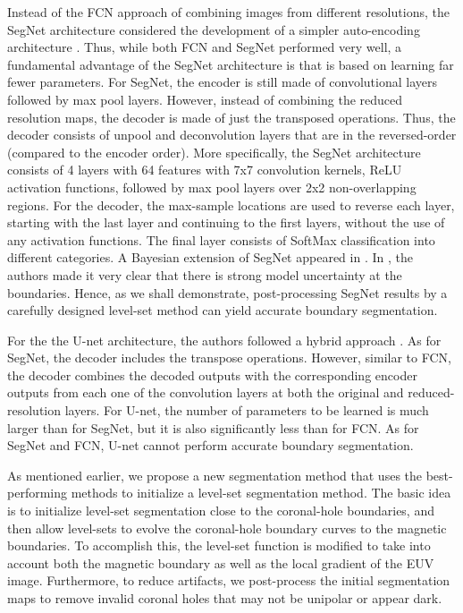 \documentclass[journal]{IEEEtran}
\begin{document}
Instead of the FCN approach of combining 
    images from different resolutions,
    the SegNet architecture considered        
    the development of a simpler
    auto-encoding architecture \cite{SegNet}.
Thus, while both FCN and SegNet performed
    very well, a fundamental advantage of the SegNet
    architecture is that is based on learning
    far fewer parameters.
For SegNet, the encoder is still
    made of convolutional layers followed
    by max pool layers.
However, instead of combining the reduced resolution maps,
    the decoder is made of just the transposed operations.
Thus, the decoder consists of unpool and deconvolution layers
    that are in the reversed-order (compared to the encoder order).
More specifically, the SegNet architecture
    consists of 4 layers with 64 
    features with 7x7 convolution kernels,
    ReLU activation functions,
    followed by max pool layers over 2x2
    non-overlapping regions.
For the decoder, the max-sample locations are used
to reverse each layer, starting with the last layer
and continuing to the first layers, without 
the use of any activation functions.
The final layer consists of SoftMax classification
   into different categories.
A Bayesian extension of SegNet appeared in 
   \cite{BayesianSegNet}.
In \cite{BayesianSegNet}, the authors made it very
   clear that there is strong model uncertainty at
   the boundaries.
Hence, as we shall demonstrate, post-processing
   SegNet results by a carefully designed
   level-set method can yield accurate 
   boundary segmentation.

For the the U-net architecture, the authors
   followed a hybrid approach \cite{UNet}.
As for SegNet, the decoder includes
   the transpose operations.
However, similar to FCN, the decoder combines
   the decoded outputs with the corresponding
   encoder outputs from each one of the convolution layers
   at both the original and reduced-resolution layers.
For U-net, the number of parameters to be learned
   is much larger than for SegNet, but it is also significantly
   less than for FCN.
As for SegNet and FCN, U-net cannot perform accurate boundary segmentation.   

As mentioned earlier,
   we propose a new segmentation method
   that uses the best-performing methods to initialize
   a level-set segmentation method.
The basic idea is to initialize
   level-set segmentation close
   to the coronal-hole boundaries,
   and then allow level-sets to evolve
   the coronal-hole boundary curves to 
   the magnetic boundaries.
To accomplish this, the level-set function
   is modified to take into account
   both the magnetic boundary as well as
   the local gradient of the EUV image.   
Furthermore, to reduce artifacts,
   we post-process the initial segmentation
   maps to remove invalid coronal holes
   that may not be
   unipolar or appear dark.
\end{document}
